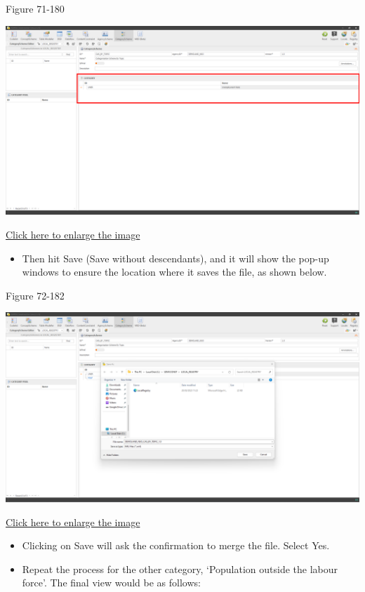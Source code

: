 \documentclass[
]{book}
\providecommand{\tightlist}{%
  \setlength{\itemsep}{0pt}\setlength{\parskip}{0pt}}
\theoremstyle{definition}
\theoremstyle{definition}
\theoremstyle{definition}
\theoremstyle{definition}
\theoremstyle{remark}
\begin{document}
Figure 71-180

\begin{center}\includegraphics[width=1\linewidth]{./images/image180} \end{center}

\href{images/image180.png}{Click here to enlarge the image}

\begin{itemize}
\tightlist
\item
  Then hit Save (Save without descendants), and it will show the pop-up windows to ensure the location where it saves the file, as shown below.
\end{itemize}

Figure 72-182

\begin{center}\includegraphics[width=1\linewidth]{./images/image182} \end{center}

\href{images/image182.png}{Click here to enlarge the image}

\begin{itemize}
\tightlist
\item
  Clicking on Save will ask the confirmation to merge the file. Select Yes.
\item
  Repeat the process for the other category, `Population outside the labour force'. The final view would be as follows:
\end{itemize}
\end{document}
